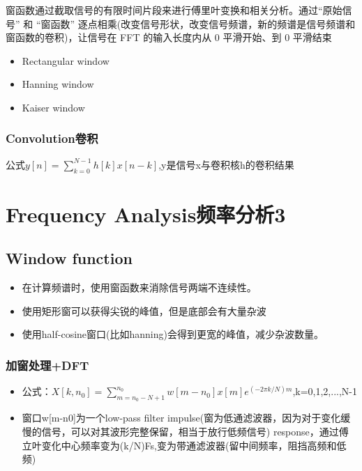 \documentclass[UTF8]{ctexart}
\begin{document}
窗函数通过截取信号的有限时间片段来进行傅里叶变换和相关分析。通过“原始信号” 和 “窗函数” 逐点相乘(改变信号形状，改变信号频谱，新的频谱是信号频谱和窗函数的卷积)，让信号在 FFT 的输入长度内从 0 平滑开始、到 0 平滑结束

\begin{itemize}
    \item Rectangular window
    \item Hanning window
    \item Kaiser window
\end{itemize}

\subsubsection{Convolution卷积}

公式$y[n]=\sum\limits^{N-1}_{k=0}h[k]x[n-k]$,y是信号x与卷积核h的卷积结果

\section{Frequency Analysis频率分析3}

\subsection{Window function}

\begin{itemize}
    \item 在计算频谱时，使用窗函数来消除信号两端不连续性。
    \item 使用矩形窗可以获得尖锐的峰值，但是底部会有大量杂波
    \item 使用half-cosine窗口(比如hanning)会得到更宽的峰值，减少杂波数量。
\end{itemize}

\subsubsection{加窗处理+DFT}
\begin{itemize}
    \item 公式：$X[k,n_{0}]=\sum\limits^{n_{0}}_{m=n_{0}-N+1}w[m-n_{0}]x[m]e^{(-2\pi k/N)m}$,k=0,1,2,...,N-1
    \item 窗口w[m-n0]为一个low-pass filter impulse(窗为低通滤波器，因为对于变化缓慢的信号，可以对其波形完整保留，相当于放行低频信号) response，通过傅立叶变化中心频率变为(k/N)Fs,变为带通滤波器(留中间频率，阻挡高频和低频)
\end{itemize}
\end{document}
